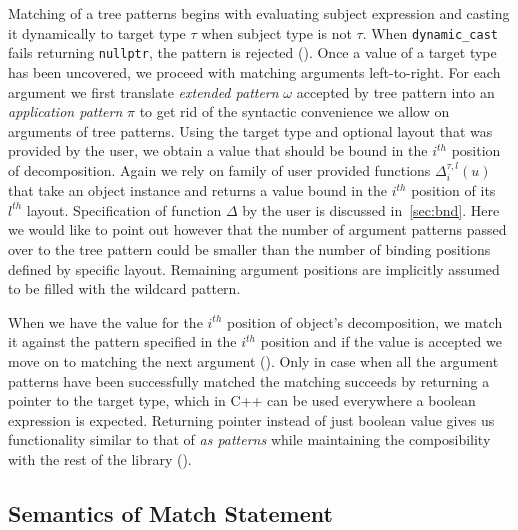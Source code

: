\documentclass[preprint]{sigplanconf}
\makeatletter
\DeclareRobustCommand{\code}[1]{{\lstinline[breaklines=false,escapechar=@]{#1}}}
\makeatother
\begin{document}
Matching of a tree patterns begins with evaluating subject expression and 
casting it dynamically to target type $\tau$ when subject type is not $\tau$. 
When \code{dynamic_cast} fails returning \code{nullptr}, the pattern is rejected 
(). Once a value of a target type has been uncovered, 
we proceed with matching arguments left-to-right. For each argument we first 
translate \emph{extended pattern} $\omega$ accepted by tree pattern into an 
\emph{application pattern} $\pi$ to get rid of the syntactic convenience we 
allow on arguments of tree patterns. Using the target type and optional layout 
that was provided by the user, we obtain a value that should be bound in the 
$i^{th}$ position of decomposition. Again we rely on family of user provided 
functions $\Delta_i^{\tau,l}(u)$ that take an object instance and returns a 
value bound in the $i^{th}$ position of its $l^{th}$ layout. Specification of 
function $\Delta$ by the user is discussed in~\textsection\ref{sec:bnd}. Here we 
would like to point out however that the number of argument patterns passed over 
to the tree pattern could be smaller than the number of binding positions defined 
by specific layout. Remaining argument positions are implicitly assumed to be 
filled with the wildcard pattern.

When we have the value for the $i^{th}$ position of object's decomposition, we 
match it against the pattern specified in the $i^{th}$ position and if the value 
is accepted we move on to matching the next argument (). 
Only in case when all the argument patterns have been successfully matched the 
matching succeeds by returning a pointer to the target type, which in C++ can be 
used everywhere a boolean expression is expected. Returning pointer instead of 
just boolean value gives us functionality similar to that of \emph{as 
patterns} while maintaining the composibility with the 
rest of the library ().

\subsection{Semantics of Match Statement}
\label{sec:semms}
\end{document}
